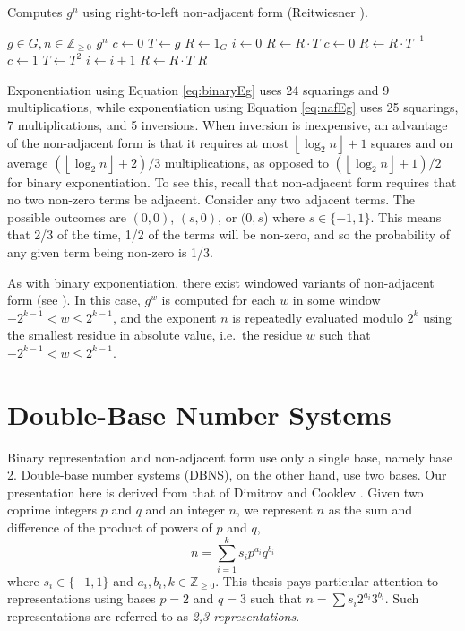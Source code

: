 \documentclass{ucalgthes1}
\theoremstyle{definition}
\newcommand{\ZZgez}{\mathbb{Z}_{\ge 0}}
\newcommand{\floor}[1]{\left\lfloor #1 \right\rfloor}
\begin{document}
\begin{algorithm}[htb]
\caption{Computes $g^n$ using right-to-left non-adjacent form (Reitwiesner \cite{reitwiesner1960}).}
\label{alg:nafR2LImmutable}
\begin{algorithmic}[1]
\Require $g \in G, n \in \ZZgez$
\Ensure $g^n$
\State $c \gets 0$ 
\State $T \gets g$ 
\State $R \gets 1_G$
\State $i \gets 0$
	\If {$\floor{n/2^i}+c \equiv 1 \pmod 4$}
		\State $R \gets R \cdot T$
		\State $c \gets 0$
	\ElsIf {$\floor{n/2^i}+c \equiv 3 \pmod 4$}
		\State $R \gets R \cdot T^{-1}$
		\State $c \gets 1$
	\EndIf
	\State $T \gets T^2$
	\State $i \gets i+1$
\EndWhile
{} \State $R \gets R \cdot T$ \EndIf
\State \Return $R$
\end{algorithmic}
\end{algorithm}

Exponentiation using Equation \ref{eq:binaryEg} uses 24 squarings and 9 multiplications, while exponentiation using Equation \ref{eq:nafEg} uses 25 squarings, 7 multiplications, and 5 inversions.  When inversion is inexpensive, an advantage of the non-adjacent form is that it requires at most $\floor{\log_2 n}+1$ squares and on average $(\floor{\log_2 n}+2)/3$ multiplications, as opposed to $(\floor{\log_2 n}+1)/2$ for binary exponentiation.  To see this, recall that non-adjacent form requires that no two non-zero terms be adjacent.  Consider any two adjacent terms.  The possible outcomes are $(0,0)$, $(s, 0)$, or $(0, s$) where $s \in \{-1, 1\}$. This means that 2/3 of the time, 1/2 of the terms will be non-zero, and so the probability of any given term being non-zero is 1/3.

As with binary exponentiation, there exist windowed variants of non-adjacent form (see \cite[Algorithm~9.20.~p.153]{Cohen2006}).   In this case, $g^w$ is computed for each $w$ in some window $-2^{k-1} < w \le 2^{k-1}$, and the exponent $n$ is repeatedly evaluated modulo $2^k$ using the smallest residue in absolute value, i.e.\ the residue $w$ such that $-2^{k-1} < w \le 2^{k-1}$.

\section{Double-Base Number Systems}
\label{sec:dbns}

Binary representation and non-adjacent form use only a single base, namely base 2.  Double-base number systems (DBNS), on the other hand, use two bases.  Our presentation here is derived from that of Dimitrov and Cooklev \cite{Dimitrov1995a, Dimitrov1995b}.  Given two coprime integers $p$ and $q$ and an integer $n$, we represent $n$ as the sum and difference of the product of powers of $p$ and $q$,
\begin{equation}\label{eq:generalDbnsForm}
	n = \sum_{i=1}^k s_i p^{a_i} q^{b_i}
\end{equation}
where $s_i \in \{-1, 1\}$ and $a_i, b_i, k \in \ZZgez$. This thesis pays particular attention to representations using bases $p=2$ and $q=3$ such that $n = \sum s_i 2^{a_i} 3^{b_i}$.  Such representations are referred to as \emph{2,3 representations}.
\end{document}
